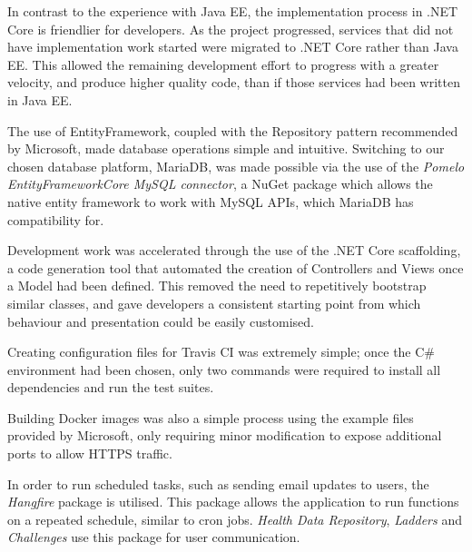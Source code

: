 In contrast to the experience with Java EE, the implementation process in .NET Core is friendlier for developers. As the project progressed, services that did not have implementation work started were migrated to .NET Core rather than Java EE. This allowed the remaining development effort to progress with a greater velocity, and produce higher quality code, than if those services had been written in Java EE.

The use of EntityFramework, coupled with the Repository pattern\cite{dotnet_repository_pattern} recommended by Microsoft, made database operations simple and intuitive. Switching to our chosen database platform, MariaDB, was made possible via the use of the \textit{Pomelo EntityFrameworkCore MySQL connector}\cite{Pomelo}, a NuGet package which allows the native entity framework to work with MySQL APIs, which MariaDB has compatibility for.

Development work was accelerated through the use of the .NET Core scaffolding, a code generation tool that automated the creation of Controllers and Views once a Model had been defined. This removed the need to repetitively bootstrap similar classes, and gave developers a consistent starting point from which behaviour and presentation could be easily customised.

Creating configuration files for Travis CI was extremely simple; once the C\# environment had been chosen, only two commands were required to install all dependencies and run the test suites.

Building Docker images was also a simple process using the example files provided by Microsoft\cite{dotnet_docker}, only requiring minor modification to expose additional ports to allow HTTPS traffic.

In order to run scheduled tasks, such as sending email updates to users, the \textit{Hangfire}\cite{hangfire} package is utilised. This package allows the application to run functions on a repeated schedule, similar to cron jobs. \textit{Health Data Repository}, \textit{Ladders} and \textit{Challenges} use this package for user communication.
